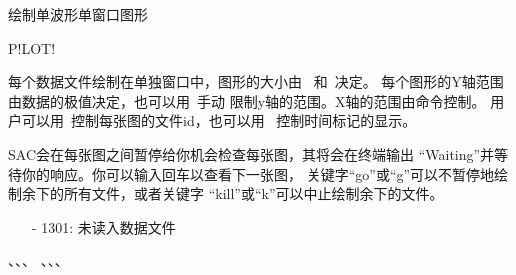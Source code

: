 \label{cmd:plot}

绘制单波形单窗口图形

\begin{SACSTX}
P!LOT!
\end{SACSTX}

每个数据文件绘制在单独窗口中，图形的大小由
~和~决定。
每个图形的Y轴范围由数据的极值决定，也可以用~手动
限制y轴的范围。X轴的范围由命令控制。
用户可以用~控制每张图的文件id，也可以用
~控制时间标记的显示。

SAC会在每张图之间暂停给你机会检查每张图，其将会在终端输出
``Waiting''并等待你的响应。你可以输入回车以查看下一张图，
关键字``go''或``g''可以不暂停地绘制余下的所有文件，或者关键字
``kill''或``k''可以中止绘制余下的文件。

\begin{itemize}
\item[-]1301: 未读入数据文件
\end{itemize}

、、、
、、、

